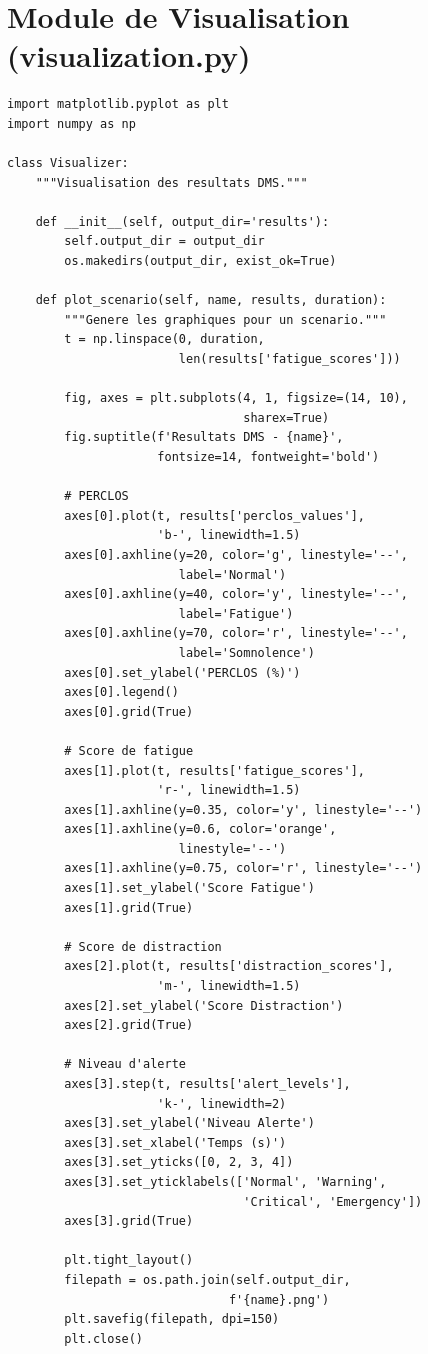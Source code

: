 \documentclass[12pt,a4paper,twoside]{report}
\begin{document}
\section{Module de Visualisation (visualization.py)}

\begin{lstlisting}[style=pythonstyle, caption={Extrait du module de visualisation.}, label={lst:visualization}]
import matplotlib.pyplot as plt
import numpy as np

class Visualizer:
    """Visualisation des resultats DMS."""
    
    def __init__(self, output_dir='results'):
        self.output_dir = output_dir
        os.makedirs(output_dir, exist_ok=True)
    
    def plot_scenario(self, name, results, duration):
        """Genere les graphiques pour un scenario."""
        t = np.linspace(0, duration, 
                        len(results['fatigue_scores']))
        
        fig, axes = plt.subplots(4, 1, figsize=(14, 10),
                                 sharex=True)
        fig.suptitle(f'Resultats DMS - {name}', 
                     fontsize=14, fontweight='bold')
        
        # PERCLOS
        axes[0].plot(t, results['perclos_values'], 
                     'b-', linewidth=1.5)
        axes[0].axhline(y=20, color='g', linestyle='--',
                        label='Normal')
        axes[0].axhline(y=40, color='y', linestyle='--',
                        label='Fatigue')
        axes[0].axhline(y=70, color='r', linestyle='--',
                        label='Somnolence')
        axes[0].set_ylabel('PERCLOS (%)')
        axes[0].legend()
        axes[0].grid(True)
        
        # Score de fatigue
        axes[1].plot(t, results['fatigue_scores'], 
                     'r-', linewidth=1.5)
        axes[1].axhline(y=0.35, color='y', linestyle='--')
        axes[1].axhline(y=0.6, color='orange', 
                        linestyle='--')
        axes[1].axhline(y=0.75, color='r', linestyle='--')
        axes[1].set_ylabel('Score Fatigue')
        axes[1].grid(True)
        
        # Score de distraction
        axes[2].plot(t, results['distraction_scores'], 
                     'm-', linewidth=1.5)
        axes[2].set_ylabel('Score Distraction')
        axes[2].grid(True)
        
        # Niveau d'alerte
        axes[3].step(t, results['alert_levels'], 
                     'k-', linewidth=2)
        axes[3].set_ylabel('Niveau Alerte')
        axes[3].set_xlabel('Temps (s)')
        axes[3].set_yticks([0, 2, 3, 4])
        axes[3].set_yticklabels(['Normal', 'Warning', 
                                 'Critical', 'Emergency'])
        axes[3].grid(True)
        
        plt.tight_layout()
        filepath = os.path.join(self.output_dir, 
                               f'{name}.png')
        plt.savefig(filepath, dpi=150)
        plt.close()
\end{lstlisting}
\end{document}
